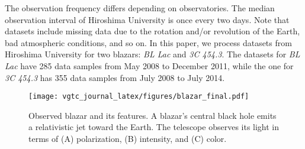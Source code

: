 The observation frequency differs depending on observatories.
The median observation interval of Hiroshima University is once every two days.
Note that datasets include missing data due to the rotation and/or revolution of the Earth, bad atmospheric conditions, and so on.
In this paper, we process datasets from Hiroshima University for two blazars: \emph{BL Lac} and \emph{3C 454.3}. 
The datasets for \emph{BL Lac} have 285 data samples from May 2008 to December 2011, while the one for \emph{3C 454.3} has 355 data samples from July 2008 to July 2014.


\begin{figure}[tb]
    \centering
        \texttt{[image: vgtc\_journal\_latex/figures/blazar\_final.pdf]}
    \caption{Observed blazar and its features. A blazar's central black hole emits a relativistic jet toward the Earth.
        The telescope observes its light in terms of (A) polarization, (B) intensity, and (C) color.}
    \label{fig:blazar}
\end{figure}


